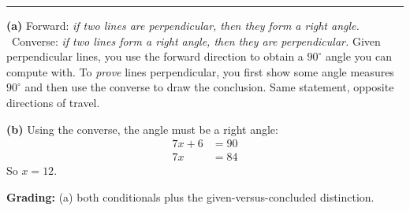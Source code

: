 \documentclass[12pt]{article}
\begin{document}
\vspace{0.2cm}\noindent\rule{\linewidth}{0.2pt}


\textbf{(a)} Forward: \emph{if two lines are perpendicular, then they form a right angle.} \ Converse: \emph{if two lines form a right angle, then they are perpendicular.} Given perpendicular lines, you use the forward direction to obtain a $90^\circ$ angle you can compute with. To \emph{prove} lines perpendicular, you first show some angle measures $90^\circ$ and then use the converse to draw the conclusion. Same statement, opposite directions of travel.

\textbf{(b)} Using the converse, the angle must be a right angle:
\begin{align*}
  7x + 6 &= 90 \\
  7x &= 84
\end{align*}
So $x = 12$. 

\textbf{Grading:} (a) both conditionals plus the given-versus-concluded distinction.
\end{document}
